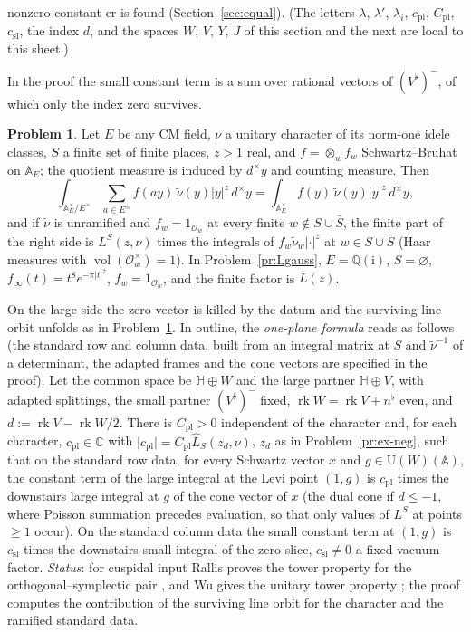 \documentclass[reqno]{amsart}
\theoremstyle{definition}
\newtheorem{problem}{Problem}[section]
\theoremstyle{plain}
\newcommand{\Q}{\mathbb Q}
\newcommand{\C}{\mathbb C}
\newcommand{\A}{\mathbb A}
\newcommand{\Oc}{\mathcal O}
\newcommand{\vol}{\operatorname{vol}}
\newcommand{\U}{\mathrm{U}}
\newcommand{\Vb}{V^\flat}
\newcommand{\nb}{n^\flat}
\newcommand{\ii}{\mathrm{i}}
\begin{document}
nonzero constant \(\mathrm{er}\) is found (Section~\ref{sec:equal}).  (The letters \(\lambda\), \(\lambda'\), \(\lambda_i\), \(c_{\mathrm{pl}}\), \(C_{\mathrm{pl}}\), \(c_{\mathrm{sl}}\), the index \(d\), and the spaces \(W\), \(V\), \(Y\), \(J\) of this section and the next are local to this sheet.)

In the proof the small constant term is a sum over rational vectors of \((\Vb)^-\), of which only the index zero survives.

\begin{problem}\label{pr:tate}
Let \(E\) be any CM field, \(\nu\) a unitary character of its norm-one idele classes, \(S\) a finite set of finite places, \(z > 1\) real, and \(f = \otimes_w f_w\) Schwartz--Bruhat on \(\A_E\); the quotient measure is induced by \(d^\times y\) and counting measure.  Then
\[
  \int_{\A_E^\times/E^\times}\sum_{a \in E^\times} f(a y)\,\tilde\nu(y)\lvert y\rvert^z\,d^\times y = \int_{\A_E^\times} f(y)\,\tilde\nu(y)\lvert y\rvert^z\,d^\times y ,
\]
and if \(\tilde\nu\) is unramified and \(f_w = 1_{\Oc_w}\) at every finite \(w \notin S \cup \bar S\), the finite part of the right side is \(L^S(z,\nu)\) times the integrals of \(f_w\tilde\nu_w\lvert\cdot\rvert^z\) at \(w \in S \cup \bar S\) (Haar measures with \(\vol(\Oc_w^\times) = 1\)).  In Problem~\ref{pr:Lgauss}, \(E = \Q(\ii)\), \(S = \varnothing\), \(f_\infty(t) = t^8e^{-\pi\lvert t\rvert^2}\), \(f_w = 1_{\Oc_w}\), and the finite factor is \(L(z)\).
\end{problem}

On the large side the zero vector is killed by the datum and the surviving line orbit unfolds as in Problem~\ref{pr:tate}.  In outline, the \emph{one-plane formula} reads as follows (the standard row and column data, built from an integral matrix at \(S\) and \(\tilde\nu^{-1}\) of a determinant, the adapted frames and the cone vectors are specified in the proof).  Let the common space be \(\mathbb H \oplus W\) and the large partner \(\mathbb H \oplus V\), with adapted splittings, the small partner \((\Vb)^-\) fixed, \(\operatorname{rk} W = \operatorname{rk} V + \nb\) even, and \(d := \operatorname{rk} V - \operatorname{rk} W/2\).  There is \(C_{\mathrm{pl}} > 0\) independent of the character and, for each character, \(c_{\mathrm{pl}} \in \C\) with \(\lvert c_{\mathrm{pl}}\rvert = C_{\mathrm{pl}}\hat L_S(z_d, \nu)\), \(z_d\) as in Problem~\ref{pr:ex-neg}, such that on the standard row data, for every Schwartz vector \(x\) and \(g \in \U(W)(\A)\), the constant term of the large integral at the Levi point \((1, g)\) is \(c_{\mathrm{pl}}\) times the downstairs large integral at \(g\) of the cone vector of \(x\) (the dual cone if \(d \le -1\), where Poisson summation precedes evaluation, so that only values of \(L^S\) at points \(\ge 1\) occur).  On the standard column data the small constant term at \((1, g)\) is \(c_{\mathrm{sl}}\) times the downstairs small integral of the zero slice, \(c_{\mathrm{sl}} \ne 0\) a fixed vacuum factor.  \emph{Status}: for cuspidal input Rallis proves the tower property for the orthogonal--symplectic pair \cite[Thm.~I.1.1]{Ra84}, and Wu gives the unitary tower property \cite[Prop.~3.1]{Wu}; the proof computes the contribution of the surviving line orbit for the character and the ramified standard data.
\end{document}
